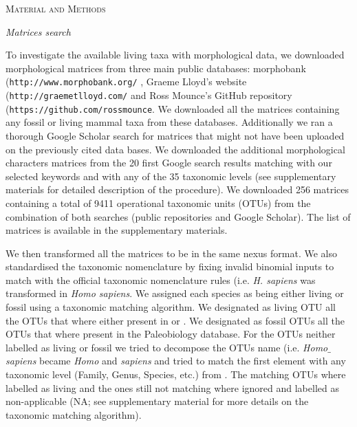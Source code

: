 \documentclass[12pt,letterpaper]{article}
\renewcommand{\section}[1]{%
\bigskip
\begin{center}
\begin{Large}
\normalfont\scshape #1
\medskip
\end{Large}
\end{center}}
\renewcommand{\subsection}[1]{%
\bigskip
\begin{center}
\begin{large}
\normalfont\itshape #1
\end{large}
\end{center}}
\begin{document}
%
%
 

\section{Material and Methods}
\subsection{Matrices search}
To investigate the available living taxa with morphological data, we downloaded morphological matrices from three main public databases: morphobank (\texttt{http://www.morphobank.org/} \citep{morphobank}, Graeme Lloyd's website (\texttt{http://graemetlloyd.com/} and Ross Mounce's GitHub repository (\texttt{https://github.com/rossmounce}. We downloaded all the matrices containing any fossil or living mammal taxa from these databases. Additionally we ran a thorough Google Scholar search for matrices that might not have been uploaded on the previously cited data bases. We downloaded the additional morphological characters matrices from the 20 first Google search results matching with our selected keywords and with any of the 35 taxonomic levels (see supplementary materials for detailed description of the procedure). We downloaded 256 %
matrices containing a total of 9411 %
operational taxonomic units (OTUs) from the combination of both searches (public repositories and Google Scholar). The list of matrices is available in the supplementary materials.

We then transformed all the matrices to be in the same nexus format. We also standardised the taxonomic nomenclature by fixing invalid binomial inputs to match with the official taxonomic nomenclature rules (i.e. \textit{H. sapiens} was transformed in \textit{Homo sapiens}. We assigned each species as being either living or fossil using a taxonomic matching algorithm. We designated as living OTU all the OTUs that where either present in \citep{FritzTree} or \citep{wilson2005mammal}. We designated as fossil OTUs all the OTUs that where present in the Paleobiology database. For the OTUs neither labelled as living or fossil we tried to decompose the OTUs name (i.e. \textit{Homo$\_$sapiens} became \textit{Homo} and \textit{sapiens} and tried to match the first element with any taxonomic level (Family, Genus, Species, etc.) from \citep{wilson2005mammal}. The matching OTUs where labelled as living and the ones still not matching where ignored and labelled as non-applicable (NA; see supplementary material for more details on the taxonomic matching algorithm).
\end{document}
